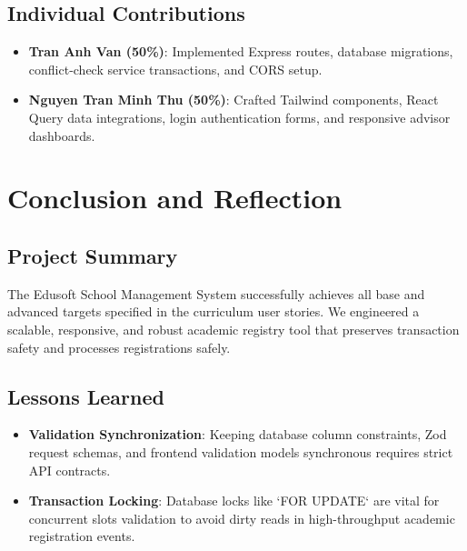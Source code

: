 \documentclass[12pt,a4paper]{report}
\begin{document}
\section{Individual Contributions}
\begin{itemize}
    \item \textbf{Tran Anh Van (50\%)}: Implemented Express routes, database migrations, conflict-check service transactions, and CORS setup.
    \item \textbf{Nguyen Tran Minh Thu (50\%)}: Crafted Tailwind components, React Query data integrations, login authentication forms, and responsive advisor dashboards.
\end{itemize}

\chapter{Conclusion and Reflection}
\section{Project Summary}
The Edusoft School Management System successfully achieves all base and advanced targets specified in the curriculum user stories. We engineered a scalable, responsive, and robust academic registry tool that preserves transaction safety and processes registrations safely.

\section{Lessons Learned}
\begin{itemize}
    \item \textbf{Validation Synchronization}: Keeping database column constraints, Zod request schemas, and frontend validation models synchronous requires strict API contracts.
    \item \textbf{Transaction Locking}: Database locks like `FOR UPDATE` are vital for concurrent slots validation to avoid dirty reads in high-throughput academic registration events.
\end{itemize}
\appendix
\end{document}
